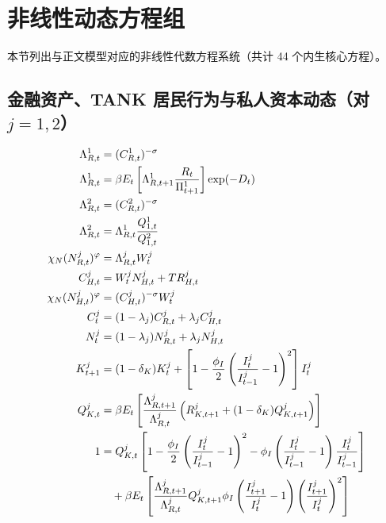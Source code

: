 \documentclass[12pt,UTF8]{ctexart}
\begin{document}
	\section{非线性动态方程组}
	
	本节列出与正文模型对应的非线性代数方程系统（共计 44 个内生核心方程）。
	
	\subsection{金融资产、TANK 居民行为与私人资本动态（对 $j=1,2$）}
	\begin{align}
		\Lambda_{R,t}^1 &=(C_{R,t}^1)^{-\sigma} \label{a1}\\
		\Lambda_{R,t}^1 &=\beta E_t\left[\Lambda_{R,t+1}^1\frac{R_t}{\Pi_{t+1}^1}\right]\exp(-D_t) \label{a2}\\
		\Lambda_{R,t}^2 &=(C_{R,t}^2)^{-\sigma} \label{a3}\\
		\Lambda_{R,t}^2 &=\Lambda_{R,t}^1\frac{Q_{1,t}^1}{Q_{1,t}^2} \label{a4}\\
		\chi_N(N_{R,t}^j)^{\varphi} &=\Lambda_{R,t}^jW_t^j \label{a5}\\
		C_{H,t}^j &=W_t^jN_{H,t}^j+TR_{H,t}^j \label{a6}\\
		\chi_N(N_{H,t}^j)^{\varphi} &=(C_{H,t}^j)^{-\sigma}W_t^j \label{a7}\\
		C_t^j &=(1-\lambda_j)C_{R,t}^j+\lambda_jC_{H,t}^j \label{a8}\\
		N_t^j &=(1-\lambda_j)N_{R,t}^j+\lambda_jN_{H,t}^j \label{a9}\\
		K_{t+1}^j &=(1-\delta_K)K_t^j+ \left[1-\frac{\phi_I}{2}\left(\frac{I_t^j}{I_{t-1}^j}-1\right)^2\right]I_t^j \label{a10}\\
		Q_{K,t}^j &=\beta E_t\left[ \frac{\Lambda_{R,t+1}^j}{\Lambda_{R,t}^j} \left(R_{K,t+1}^j+(1-\delta_K)Q_{K,t+1}^j\right) \right] \label{a11}\\
		1 &=Q_{K,t}^j \left[ 1-\frac{\phi_I}{2}\left(\frac{I_t^j}{I_{t-1}^j}-1\right)^2 - \phi_I\left(\frac{I_t^j}{I_{t-1}^j}-1\right)\frac{I_t^j}{I_{t-1}^j} \right] \notag\\
		&\quad+\beta E_t\left[ \frac{\Lambda_{R,t+1}^j}{\Lambda_{R,t}^j} Q_{K,t+1}^j \phi_I\left(\frac{I_{t+1}^j}{I_t^j}-1\right) \left(\frac{I_{t+1}^j}{I_t^j}\right)^2 \right] \label{a12}
	\end{align}
	
\end{document}
